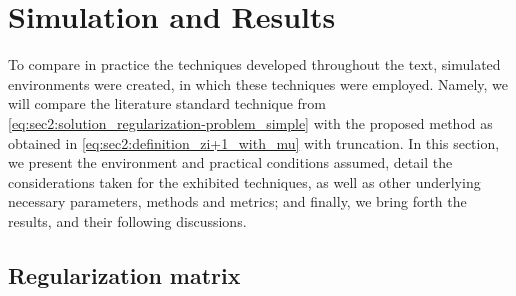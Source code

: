 \section{Simulation and Results}
\label{sec:simulation_and_results}
\def\sympath{h386f}


To compare in practice the techniques developed throughout the text, simulated environments were created, in which these techniques were employed. Namely, we will compare the literature standard technique from \cref{eq:sec2:solution_regularization-problem_simple} with the proposed method as obtained in \cref{eq:sec2:definition_zi+1_with_mu} with truncation. In this section, we present the environment and practical conditions assumed, detail the considerations taken for the exhibited techniques, as well as other underlying necessary parameters, methods and metrics; and finally, we bring forth the results, and their following discussions.

\subsection{Regularization matrix}

